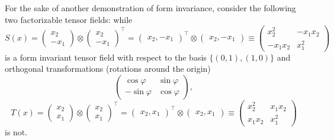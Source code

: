 {For the sake of another demonstration of form invariance, consider the following two factorizable tensor fields:
while
\begin{equation}
{S}(x)=
\begin{pmatrix}
  {  x}_2  \\
- {  x}_1
\end{pmatrix}
\otimes
\begin{pmatrix}
   {  x}_2  \\
 - {  x}_1
\end{pmatrix}^\intercal
=
\begin{pmatrix}    {  x}_2 ,- {  x}_1  \end{pmatrix}^\intercal
\otimes
\begin{pmatrix}   {  x}_2 ,- {  x}_1  \end{pmatrix}
\equiv
\begin{pmatrix}
   {  x}_2^2          & -{ x}_1{x}_2  \\
 - {  x}_1{  x}_2     & { x}_1^2
\end{pmatrix}
\label{2012-m-ch-tensor-etotccon1factorized}
\end{equation}
is a form invariant tensor field with respect to the basis $\{(0,1),(1,0)\}$
and orthogonal transformations (rotations around the origin)
\begin{equation}
\begin{pmatrix}
  \cos \varphi & \sin \varphi  \\
 -\sin \varphi & \cos \varphi
\end{pmatrix}
,
\end{equation}
\begin{equation}
{ T}(x)=
\begin{pmatrix}
{  x}_2  \\
{  x}_1
\end{pmatrix}
\otimes
\begin{pmatrix}
{  x}_2  \\
{  x}_1 \end{pmatrix}^\intercal
=
\begin{pmatrix}   {  x}_2 ,  {  x}_1  \end{pmatrix}^\intercal
\otimes
\begin{pmatrix}    {  x}_2 ,  {  x}_1 \end{pmatrix}
\equiv
\begin{pmatrix}
{  x}_2^2 & { x}_1{  x}_2  \\
{  x}_1{  x}_2          & { x}_1^2
\end{pmatrix}
\end{equation}
is not.

}
